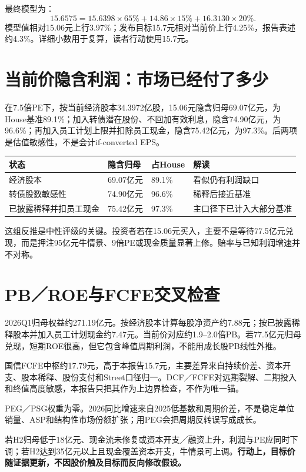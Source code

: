 最终模型为：
\[
15.6575=15.6398\times65\%+14.86\times15\%+16.3130\times20\%.
\]
模型值相对15.06元上行3.97\%；发布目标15.7元相对当前价上行4.25\%，报告表述约4.3\%。详细小数用于复算，读者行动使用15.7元。

\section{当前价隐含利润：市场已经付了多少}

在7.5倍PE下，按当前经济股本34.3972亿股，15.06元隐含归母69.07亿元，为House基准89.1\%；加入转债潜在股份、不回加有效利息，隐含74.90亿元，为96.6\%；再加入员工计划上限并扣除员工现金，隐含75.42亿元，为97.3\%。后两项是估值敏感性，不是会计if-converted EPS。

\begin{exhibitbox}[当前价格隐含的2026归母]
\noindent\begin{tabularx}{\textwidth}{L{4.2cm}R{2.1cm}R{2.0cm}X}
\toprule
\textbf{状态} & \textbf{隐含归母} & \textbf{占House} & \textbf{解读} \\
\midrule
经济股本 & 69.07亿元 & 89.1\% & 看似仍有利润缺口 \\
转债股数敏感性 & 74.90亿元 & 96.6\% & 稀释后接近基准 \\
已披露稀释并扣员工现金 & 75.42亿元 & 97.3\% & 主口径下已计入大部分基准 \\
\bottomrule
\end{tabularx}
\end{exhibitbox}

这组反推是中性评级的关键。投资者若在15.06元买入，主要不是等待77.5亿元兑现，而是押注95亿元牛情景、9倍PE或现金质量显著上修。赔率与已知利润增速并不对称。

\section{PB／ROE与FCFE交叉检查}

2026Q1归母权益约271.19亿元。按经济股本计算每股净资产约7.88元；按已披露稀释股本并加入员工计划现金约7.47元。当前价对应约1.9--2.0倍PB。若77.5亿元归母兑现，短期ROE很高，但它包含峰值周期利润，不能用成长股PB线性外推。

国信FCFE中枢约17.79元，高于本报告15.7元，主要差异来自持续价差、资本开支、股本稀释、股份支付和Street口径归一。DCF／FCFE对远期裂解、二期投入和终值高度敏感，本报告只把其作为上边界检查，不作为唯一锚。

PEG／PSG权重为零。2026同比增速来自2025低基数和周期价差，不是稳定单位销量、ASP和结构性市场份额扩张；用PEG会把周期反转误写成成长。

\begin{riskbox}[估值失效条件]
若H2归母低于18亿元、现金流未修复或资本开支／融资上升，利润与PE应同时下调；若H2达到35亿元以上且现金覆盖资本开支，牛情景可上调。\textbf{行动上，目标价随证据更新，不因股价触及目标而反向修改假设。}
\end{riskbox}
